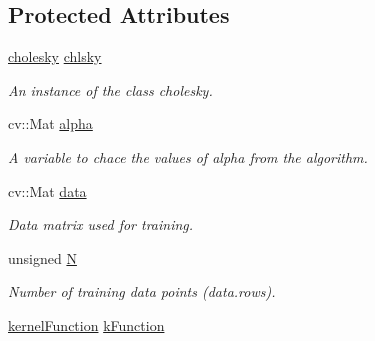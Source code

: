 \subsection*{Protected Attributes}
\begin{DoxyCompactItemize}
\item 
\hypertarget{classgaussianProcess_af4d34813374de5fcc204dfcb6bc8c65d}{
\hyperlink{classcholesky}{cholesky} \hyperlink{classgaussianProcess_af4d34813374de5fcc204dfcb6bc8c65d}{chlsky}}
\label{classgaussianProcess_af4d34813374de5fcc204dfcb6bc8c65d}

\begin{DoxyCompactList}\small\item\em An instance of the class {\ttfamily cholesky}. \item\end{DoxyCompactList}\item 
\hypertarget{classgaussianProcess_a62197192f0fbf4e0675eb37be1c4c175}{
cv::Mat \hyperlink{classgaussianProcess_a62197192f0fbf4e0675eb37be1c4c175}{alpha}}
\label{classgaussianProcess_a62197192f0fbf4e0675eb37be1c4c175}

\begin{DoxyCompactList}\small\item\em A variable to chace the values of  alpha from the algorithm. \item\end{DoxyCompactList}\item 
\hypertarget{classgaussianProcess_a511ae0b1c13f95e5f08f1a0dd3da3d93}{
cv::Mat \hyperlink{classgaussianProcess_a511ae0b1c13f95e5f08f1a0dd3da3d93}{data}}
\label{classgaussianProcess_a511ae0b1c13f95e5f08f1a0dd3da3d93}

\begin{DoxyCompactList}\small\item\em Data matrix used for training. \item\end{DoxyCompactList}\item 
\hypertarget{classgaussianProcess_a8cc2e7240164328fdc3f0e5e21032c56}{
unsigned \hyperlink{classgaussianProcess_a8cc2e7240164328fdc3f0e5e21032c56}{N}}
\label{classgaussianProcess_a8cc2e7240164328fdc3f0e5e21032c56}

\begin{DoxyCompactList}\small\item\em Number of training data points (data.rows). \item\end{DoxyCompactList}\item 
\hypertarget{classgaussianProcess_a8bdc4bd1a948123887fff4e6cce31147}{
\hyperlink{classgaussianProcess_a9255dbcbf2dc6ef9723b538659acd491}{kernelFunction} \hyperlink{classgaussianProcess_a8bdc4bd1a948123887fff4e6cce31147}{kFunction}}
\label{classgaussianProcess_a8bdc4bd1a948123887fff4e6cce31147}


\end{DoxyCompactItemize}
